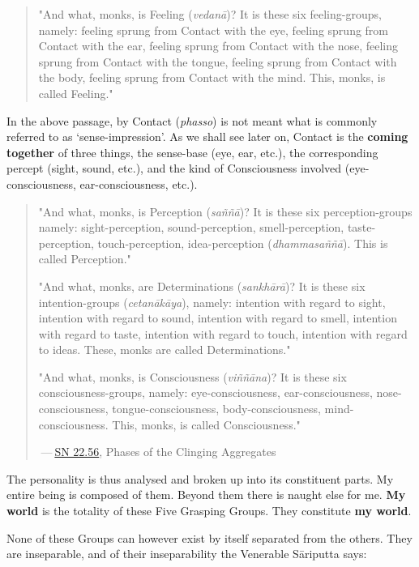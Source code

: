 \begin{quotation}
"And what, monks, is Feeling (\emph{vedanā})? It is these six
feeling-groups, namely: feeling sprung from Contact with the eye,
feeling sprung from Contact with the ear, feeling sprung from Contact
with the nose, feeling sprung from Contact with the tongue, feeling
sprung from Contact with the body, feeling sprung from Contact with the
mind. This, monks, is called Feeling."


\end{quotation}

In the above passage, by Contact (\emph{phasso}) is not meant what is
commonly referred to as `sense-impression'. As we shall see later on,
Contact is the \textbf{coming together} of three things, the sense-base (eye,
ear, etc.), the corresponding percept (sight, sound, etc.), and the kind
of Consciousness involved (eye-consciousness, ear-consciousness, etc.).


\begin{quotation}
"And what, monks, is Perception (\emph{saññā})? It is these six
perception-groups namely: sight-perception, sound-perception,
smell-perception, taste-perception, touch-perception, idea-perception
(\emph{dhammasaññā}). This is called Perception."


"And what, monks, are Determinations (\emph{sankhārā})? It is these six
intention-groups (\emph{cetanākāya}), namely: intention with regard to
sight, intention with regard to sound, intention with regard to smell,
intention with regard to taste, intention with regard to touch,
intention with regard to ideas. These, monks are called Determinations."


"And what, monks, is Consciousness (\emph{viññāna})? It is these six
consciousness-groups, namely: eye-consciousness, ear-consciousness,
nose-consciousness, tongue-consciousness, body-consciousness,
mind-consciousness. This, monks, is called Consciousness."


 — \href{https://suttacentral.net/sn22.56/en/bodhi}{SN 22.56}, Phases of the Clinging Aggregates


\end{quotation}

The personality is thus analysed and broken up into its constituent
parts. My entire being is composed of them. Beyond them there is naught
else for me. \textbf{My world} is the totality of these Five Grasping Groups.
They constitute \textbf{my world}.


None of these Groups can however exist by itself separated from the
others. They are inseparable, and of their inseparability the Venerable
Sāriputta says:


